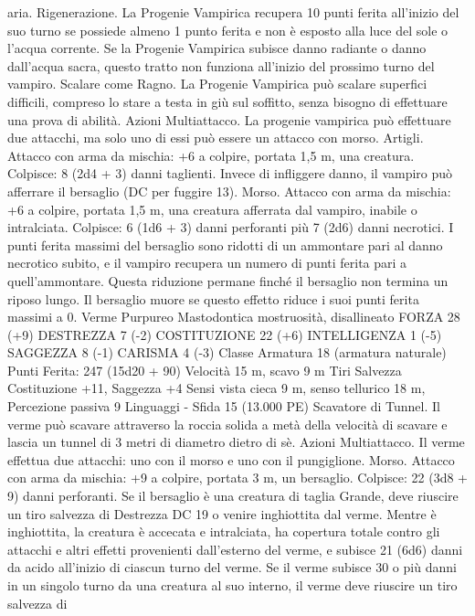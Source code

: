 \begin{multicols}{2}
aria.
Rigenerazione. La Progenie Vampirica recupera 10 punti ferita
all’inizio del suo turno se possiede almeno 1 punto ferita e non è
esposto alla luce del sole o l’acqua corrente. Se la Progenie
Vampirica subisce danno radiante o danno dall’acqua sacra,
questo tratto non funziona all’inizio del prossimo turno del
vampiro.
Scalare come Ragno. La Progenie Vampirica può scalare
superfici difficili, compreso lo stare a testa in giù sul soffitto,
senza bisogno di effettuare una prova di abilità.
Azioni
Multiattacco. La progenie vampirica può effettuare due attacchi,
ma solo uno di essi può essere un attacco con morso.
Artigli. Attacco con arma da mischia: +6 a colpire, portata 1,5
m, una creatura.
Colpisce: 8 (2d4 + 3) danni taglienti. Invece di infliggere danno,
il vampiro può afferrare il bersaglio (DC per fuggire 13).
Morso. Attacco con arma da mischia: +6 a colpire, portata 1,5 m,
una creatura afferrata dal vampiro, inabile o intralciata.
Colpisce: 6 (1d6 + 3) danni perforanti più 7 (2d6) danni necrotici. I
punti ferita massimi del bersaglio sono ridotti di un ammontare pari
al danno necrotico subito, e il vampiro recupera un numero di punti
ferita pari a quell’ammontare. Questa riduzione permane finché il
bersaglio non termina un riposo lungo. Il bersaglio muore se questo
effetto riduce i suoi punti ferita massimi a 0.
Verme Purpureo
Mastodontica mostruosità, disallineato
FORZA 28 (+9)
DESTREZZA 7 (-2)
COSTITUZIONE 22 (+6)
INTELLIGENZA 1 (-5)
SAGGEZZA 8 (-1)
CARISMA 4 (-3)
Classe Armatura 18 (armatura naturale)
\hspace*{0pt}\hfill{Punti Ferita}: 247 (15d20 + 90)
Velocità 15 m, scavo 9 m
Tiri Salvezza Costituzione +11, Saggezza +4
Sensi vista cieca 9 m, senso tellurico 18 m, Percezione passiva 9
Linguaggi -
Sfida 15 (13.000 PE)
Scavatore di Tunnel. Il verme può scavare attraverso la roccia
solida a metà della velocità di scavare e lascia un tunnel di 3
metri di diametro dietro di sè.
Azioni
Multiattacco. Il verme effettua due attacchi: uno con il morso e
uno con il pungiglione.
Morso. Attacco con arma da mischia: +9 a colpire, portata 3 m,
un bersaglio.
Colpisce: 22 (3d8 + 9) danni perforanti. Se il bersaglio è una
creatura di taglia Grande, deve riuscire un tiro salvezza di
Destrezza DC 19 o venire inghiottita dal verme. Mentre è
inghiottita, la creatura è accecata e intralciata, ha copertura totale
contro gli attacchi e altri effetti provenienti dall’esterno del
verme, e subisce 21 (6d6) danni da acido all’inizio di ciascun
turno del verme.
Se il verme subisce 30 o più danni in un singolo turno da una
creatura al suo interno, il verme deve riuscire un tiro salvezza di

\end{multicols}
